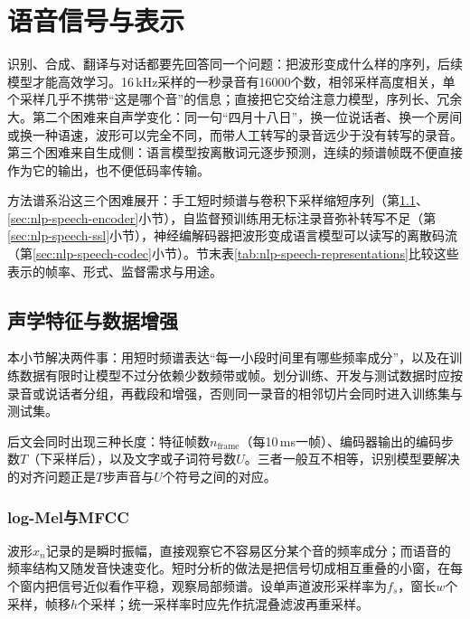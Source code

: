 \section{语音信号与表示}
\label{sec:nlp-speech-representation}

识别、合成、翻译与对话都要先回答同一个问题：把波形变成什么样的序列，后续模型才能高效学习。16\,kHz采样的一秒录音有16000个数，相邻采样高度相关，单个采样几乎不携带“这是哪个音”的信息；直接把它交给注意力模型，序列长、冗余大。第二个困难来自声学变化：同一句“四月十八日”，换一位说话者、换一个房间或换一种语速，波形可以完全不同，而带人工转写的录音远少于没有转写的录音。第三个困难来自生成侧：语言模型按离散词元逐步预测，连续的频谱帧既不便直接作为它的输出，也不便低码率传输。

方法谱系沿这三个困难展开：手工短时频谱与卷积下采样缩短序列（第\ref{sec:nlp-speech-features}、\ref{sec:nlp-speech-encoder}小节），自监督预训练用无标注录音弥补转写不足（第\ref{sec:nlp-speech-ssl}小节），神经编解码器把波形变成语言模型可以读写的离散码流（第\ref{sec:nlp-speech-codec}小节）。节末表\ref{tab:nlp-speech-representations}比较这些表示的帧率、形式、监督需求与用途。

\subsection{声学特征与数据增强}
\label{sec:nlp-speech-features}

本小节解决两件事：用短时频谱表达“每一小段时间里有哪些频率成分”，以及在训练数据有限时让模型不过分依赖少数频带或帧。划分训练、开发与测试数据时应按录音或说话者分组，再截段和增强，否则同一录音的相邻切片会同时进入训练集与测试集。

后文会同时出现三种长度：特征帧数$n_{\mathrm{frame}}$（每10\,ms一帧）、编码器输出的编码步数$T$（下采样后），以及文字或子词符号数$U$。三者一般互不相等，识别模型要解决的对齐问题正是$T$步声音与$U$个符号之间的对应。

\subsubsection{log-Mel与MFCC}
\label{sec:nlp-speech-logmel-mfcc}

波形$x_n$记录的是瞬时振幅，直接观察它不容易区分某个音的频率成分；而语音的频率结构又随发音快速变化。短时分析的做法是把信号切成相互重叠的小窗，在每个窗内把信号近似看作平稳，观察局部频谱。设单声道波形采样率为$f_s$，窗长$w$个采样，帧移$h$个采样；统一采样率时应先作抗混叠滤波再重采样。

